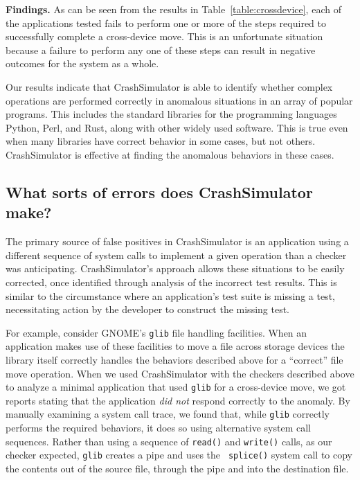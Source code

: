 {\bf Findings.} As can be seen from the results in
Table~\ref{table:crossdevice}, each of the applications tested fails to
perform one or more of the steps required to successfully complete a
cross-device move.  This is an unfortunate situation because a failure to
perform any one of these steps can result in negative outcomes for the
system as a whole.

Our results indicate that CrashSimulator is able to identify whether
complex operations are performed correctly in anomalous situations in an
array of popular programs.  This includes the standard libraries for the
programming languages Python, Perl, and Rust, along with other widely used
software.  This is true even when many libraries have correct behavior in
some cases, but not others.  CrashSimulator is effective at finding the
anomalous behaviors in these cases.


\subsection{What sorts of errors does CrashSimulator make?}
\label{sec-sorts-errors}

The primary source of false positives in CrashSimulator is an application
using a different sequence of system calls to implement a given operation
than a checker was anticipating. CrashSimulator's approach allows these
situations to be easily corrected, once identified through analysis of the
incorrect test results.  This is similar to the circumstance where an
application's test suite is missing a test, necessitating action by the
developer to construct the missing test.

For example, consider GNOME's {\tt glib} file handling facilities.  When an
application makes use of these facilities to move a file across storage
devices the library itself correctly handles the behaviors described above
for a ``correct'' file move operation.  When we used CrashSimulator with
the checkers described above to analyze a minimal application that used
{\tt glib} for a cross-device move, we got reports stating that the
application {\em did not} respond correctly to the anomaly.  By manually
examining a system call trace, we found that, while {\tt glib} correctly
performs the required behaviors, it does so using alternative system call
sequences.  Rather than using a sequence of {\tt read()} and {\tt write()}
calls, as our checker expected, {\tt glib} creates a pipe and uses the {\tt
splice()} system call to copy the contents out of the source file, through
the pipe and into the destination file.

